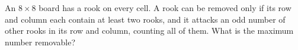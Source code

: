 An $8\times8$ board has a rook on every cell. A rook can be removed only if its row and column each contain at least two rooks, and it attacks an odd number of other rooks in its row and column, counting all of them. What is the maximum number removable?

